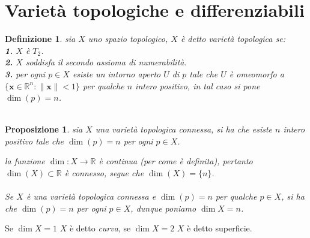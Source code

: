 \documentclass[oneside, 11pt]{amsbook}
\makeatletter
\newcommand{\0}{{(0)}}
\newcommand{\3}{{(3)}}
\theoremstyle{colonplain}
\newtheorem{prop}[thm]{Proposizione}
\theoremstyle{colondefinition}
\newtheorem{defn}[thm]{Definizione}
\theoremstyle{colonremark}
\numberwithin{equation}{chapter}
\renewcommand{\proofname}{Dimostrazione}
\renewenvironment{proof}[1][\proofname]{\par
  \pushQED{\qed}%
  \normalfont \topsep6\p@\@plus6\p@\relax
  \trivlist
  \item[\hskip\labelsep\bfseries #1:]\ignorespaces
}{%
  \popQED\endtrivlist\@endpefalse
}
\makeatother
\begin{document}
\section{Varietà topologiche e differenziabili}
\begin{defn} sia $X$ uno spazio topologico, $X$ è detto \textit{varietà topologica} se: \\
\textbf{1.} $X$ è $T_2$. \\
\textbf{2.} $X$ soddisfa il secondo assioma di numerabilità. \\
\textbf{3.} per ogni $p \in X$ esiste un intorno aperto $U$ di $p$ tale che $U$ è omeomorfo a $\{ \mathbf{x} \in \mathbb{R}^n : \| \mathbf{x} \| < 1 \}$ per qualche $n$ intero positivo, in tal caso si pone $\dim (p) = n$. \\ \\
\end{defn}
\begin{prop} sia $X$ una varietà topologica connessa, si ha che esiste $n$ intero positivo tale che $\dim (p) = n$ per ogni $p \in X$. \\

\begin{proof} la funzione $\dim : X \longrightarrow \mathbb{R}$ è continua (per come è definita), pertanto $\dim (X) \subset \mathbb{R}$ è connesso, segue che $\dim(X) = \{ n \}$. \\ \\
Se $X$ è una varietà topologica connessa e $\dim (p) = n$ per qualche $p \in X$, si ha che $\dim (p) = n$ per ogni $p \in X$, dunque poniamo $\dim X = n$. \end{proof}
\end{prop}
Se $\dim X = 1$ $X$ è detto \textit{curva}, se $\dim X = 2$ $X$ è detto superficie. \\ \\
\end{document}
